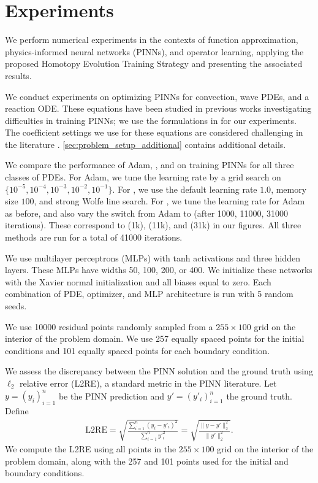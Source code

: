 \section{Experiments}
\label{sec:opt_comparison}






We perform numerical experiments in the contexts of function approximation, physics-informed neural networks (PINNs), and operator learning, applying the proposed Homotopy Evolution Training Strategy and presenting the associated results.


We conduct experiments on optimizing PINNs for convection, wave PDEs, and a reaction ODE. 
These equations have been studied in previous works investigating difficulties in training PINNs; we use the formulations in \citet{krishnapriyan2021characterizing, wang2022when} for our experiments. 
The coefficient settings we use for these equations are considered challenging in the literature \cite{krishnapriyan2021characterizing, wang2022when}.
\cref{sec:problem_setup_additional} contains additional details.

We compare the performance of Adam, \lbfgs{}, and \al{} on training PINNs for all three classes of PDEs. 
For Adam, we tune the learning rate by a grid search on $\{10^{-5}, 10^{-4}, 10^{-3}, 10^{-2}, 10^{-1}\}$.
For \lbfgs, we use the default learning rate $1.0$, memory size $100$, and strong Wolfe line search.
For \al, we tune the learning rate for Adam as before, and also vary the switch from Adam to \lbfgs{} (after 1000, 11000, 31000 iterations).
These correspond to \al{} (1k), \al{} (11k), and \al{} (31k) in our figures.
All three methods are run for a total of 41000 iterations.

We use multilayer perceptrons (MLPs) with tanh activations and three hidden layers. These MLPs have widths 50, 100, 200, or 400.
We initialize these networks with the Xavier normal initialization \cite{glorot2010understanding} and all biases equal to zero.
Each combination of PDE, optimizer, and MLP architecture is run with 5 random seeds.

We use 10000 residual points randomly sampled from a $255 \times 100$ grid on the interior of the problem domain. 
We use 257 equally spaced points for the initial conditions and 101 equally spaced points for each boundary condition.

We assess the discrepancy between the PINN solution and the ground truth using $\ell_2$ relative error (L2RE), a standard metric in the PINN literature. Let $y = (y_i)_{i = 1}^n$ be the PINN prediction and $y' = (y'_i)_{i = 1}^n$ the ground truth. Define
\begin{align*}
    \mathrm{L2RE} = \sqrt{\frac{\sum_{i = 1}^n (y_i - y'_i)^2}{\sum_{i = 1}^n y'^2_i}} = \sqrt{\frac{\|y - y'\|_2^2}{\|y'\|_2^2}}.
\end{align*}
We compute the L2RE using all points in the $255 \times 100$ grid on the interior of the problem domain, along with the 257 and 101 points used for the initial and boundary conditions.

